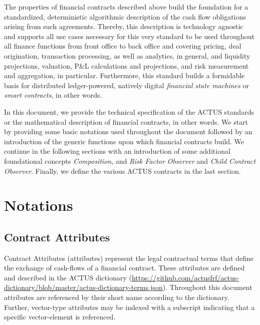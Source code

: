 \documentclass[9pt,oneside]{amsart}
\begin{document}
\begin{multicols}{2}
The properties of financial contracts described above build the foundation for a standardized, deterministic algorithmic description of the cash flow obligations arising from such agreements. Thereby, this description is technology agnostic and supports all use cases necessary for this very standard to be used throughout all finance functions from front office to back office and covering pricing, deal origination, transaction processing, as well as analytics, in general, and liquidity projections, valuation, P\&L calculations and projections, and risk measurement and aggregation, in particular. Furthermore, this standard builds a formidable basis for distributed ledger-powered, natively digital \textit{financial state machines} or \textit{smart contracts}, in other words.

In this document, we provide the technical specification of the ACTUS standards or the mathematical description of financial contracts, in other words. We start by providing some basic notations used throughout the document followed by an introduction of the generic functions upon which financial contracts build. We continue in the following sections with an introduction of some additional foundational concepts \textit{Composition}, and \textit{Risk Factor Observer} and \textit{Child Contract Observer}. Finally, we define the various ACTUS contracts in the last section.



\section{Notations}\label{sec:notations}

\subsection{Contract Attributes}\label{sec:attributes}

Contract Attributes (attributes) represent the legal contractual terms that define the exchange of cash-flows of a financial contract. These attributes are defined and described in the ACTUS dictionary (\url{https://github.com/actusfrf/actus-dictionary/blob/master/actus-dictionary-terms.json}). Throughout this document attributes are referenced by their short name according to the dictionary. Further, vector-type attributes may be indexed with a subscript indicating that a specific vector-element is referenced.


\end{multicols}
\end{document}
